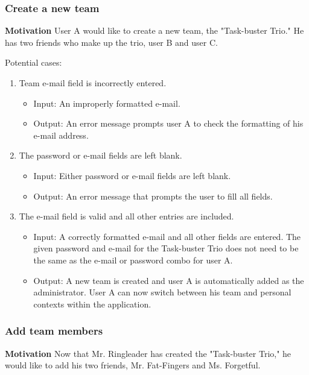 \documentclass{article}
\begin{document}
\subsubsection{Create a new team}
\textbf{Motivation} User A would like to create a new team, the
"Task-buster Trio." He has two friends who make up the trio, user B 
and user C.

Potential cases:
\begin{enumerate}
    \item Team e-mail field is incorrectly entered.
        \begin{itemize}
            \item Input: An improperly formatted e-mail.
            \item Output: An error message prompts user A to check the
formatting of his e-mail address.
        \end{itemize}
    \item The password or e-mail fields are left blank.
        \begin{itemize}
            \item Input: Either password or e-mail fields are left blank.
            \item Output: An error message that prompts the user to fill all
fields.
        \end{itemize}
    \item The e-mail field is valid and all other entries are included.
        \begin{itemize}
            \item Input: A correctly formatted e-mail and all other fields are
entered. The given password and e-mail for the Task-buster Trio does not need
to be the same as the e-mail or password combo for user A.
            \item Output: A new team is created and user A is
automatically added as the administrator.
                User A can now switch between his team and personal
contexts within the application.
        \end{itemize}
\end{enumerate}

\subsubsection{Add team members}
\textbf{Motivation} Now that Mr. Ringleader has created the "Task-buster
Trio," he would like to add his two friends, Mr. Fat-Fingers and Ms.
Forgetful.
\end{document}
